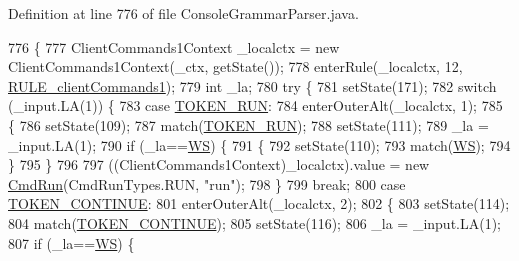 Definition at line 776 of file Console\+Grammar\+Parser.\+java.


\begin{DoxyCode}
776                                                                                     \{
777     ClientCommands1Context \_localctx = \textcolor{keyword}{new} ClientCommands1Context(\_ctx, getState());
778     enterRule(\_localctx, 12, \hyperlink{classgov_1_1nasa_1_1jpf_1_1inspector_1_1client_1_1parser_1_1_console_grammar_parser_acdbea81112f16d62575bddef3a9f3753}{RULE\_clientCommands1});
779     \textcolor{keywordtype}{int} \_la;
780     \textcolor{keywordflow}{try} \{
781       setState(171);
782       \textcolor{keywordflow}{switch} (\_input.LA(1)) \{
783       \textcolor{keywordflow}{case} \hyperlink{classgov_1_1nasa_1_1jpf_1_1inspector_1_1client_1_1parser_1_1_console_grammar_parser_a53dc3e76f1744a73e49cd87037512e14}{TOKEN\_RUN}:
784         enterOuterAlt(\_localctx, 1);
785         \{
786         setState(109);
787         match(\hyperlink{classgov_1_1nasa_1_1jpf_1_1inspector_1_1client_1_1parser_1_1_console_grammar_parser_a53dc3e76f1744a73e49cd87037512e14}{TOKEN\_RUN});
788         setState(111);
789         \_la = \_input.LA(1);
790         \textcolor{keywordflow}{if} (\_la==\hyperlink{classgov_1_1nasa_1_1jpf_1_1inspector_1_1client_1_1parser_1_1_console_grammar_parser_a6914a3a3adbc350b12a7df9d1b24abf1}{WS}) \{
791           \{
792           setState(110);
793           match(\hyperlink{classgov_1_1nasa_1_1jpf_1_1inspector_1_1client_1_1parser_1_1_console_grammar_parser_a6914a3a3adbc350b12a7df9d1b24abf1}{WS});
794           \}
795         \}
796 
797          ((ClientCommands1Context)\_localctx).value =  \textcolor{keyword}{new} \hyperlink{classgov_1_1nasa_1_1jpf_1_1inspector_1_1client_1_1commands_1_1_cmd_run}{CmdRun}(CmdRunTypes.RUN, \textcolor{stringliteral}{"run"}); 
798         \}
799         \textcolor{keywordflow}{break};
800       \textcolor{keywordflow}{case} \hyperlink{classgov_1_1nasa_1_1jpf_1_1inspector_1_1client_1_1parser_1_1_console_grammar_parser_ade8c11b735ec05d3adeb298fce4b32ef}{TOKEN\_CONTINUE}:
801         enterOuterAlt(\_localctx, 2);
802         \{
803         setState(114);
804         match(\hyperlink{classgov_1_1nasa_1_1jpf_1_1inspector_1_1client_1_1parser_1_1_console_grammar_parser_ade8c11b735ec05d3adeb298fce4b32ef}{TOKEN\_CONTINUE});
805         setState(116);
806         \_la = \_input.LA(1);
807         \textcolor{keywordflow}{if} (\_la==\hyperlink{classgov_1_1nasa_1_1jpf_1_1inspector_1_1client_1_1parser_1_1_console_grammar_parser_a6914a3a3adbc350b12a7df9d1b24abf1}{WS}) \{

\end{DoxyCode}
